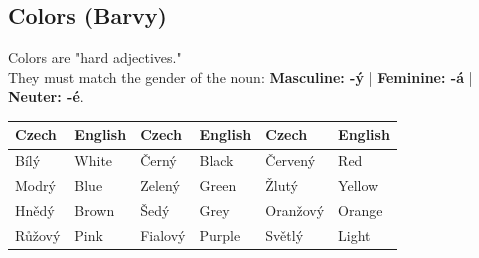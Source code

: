 \subsection{Colors (Barvy)}
Colors are "hard adjectives."\\
They must match the gender of the noun:
\textbf{Masculine: -ý} | \textbf{Feminine: -á} | \textbf{Neuter: -é}.

\begin{center}
\begin{tabular}{ll|ll|ll}
\hline
\textbf{Czech} & \textbf{English} & \textbf{Czech} & \textbf{English} & \textbf{Czech} & \textbf{English} \\ \hline
Bílý    & White  & Černý    & Black  & Červený  & Red    \\
Modrý   & Blue   & Zelený   & Green  & Žlutý    & Yellow \\
Hnědý   & Brown  & Šedý     & Grey   & Oranžový & Orange \\
Růžový  & Pink   & Fialový  & Purple & Světlý   & Light  \\ \hline
\end{tabular}
\end{center}